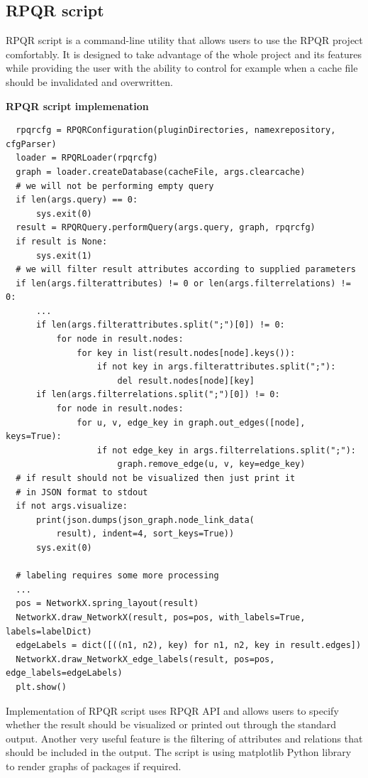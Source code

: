 \newpage

\subsection*{RPQR script}
RPQR script is a command-line utility that allows users to use the RPQR project comfortably. It is designed
to take advantage of the whole project and its features while providing the user with the ability to
control for example when a cache file should be invalidated and overwritten.

\textbf{RPQR script implemenation}

\begin{lstlisting}
  rpqrcfg = RPQRConfiguration(pluginDirectories, namexrepository, cfgParser)
  loader = RPQRLoader(rpqrcfg)
  graph = loader.createDatabase(cacheFile, args.clearcache)
  # we will not be performing empty query
  if len(args.query) == 0:
      sys.exit(0)
  result = RPQRQuery.performQuery(args.query, graph, rpqrcfg)
  if result is None:
      sys.exit(1)
  # we will filter result attributes according to supplied parameters
  if len(args.filterattributes) != 0 or len(args.filterrelations) != 0:
      ...
      if len(args.filterattributes.split(";")[0]) != 0:
          for node in result.nodes:
              for key in list(result.nodes[node].keys()):
                  if not key in args.filterattributes.split(";"):
                      del result.nodes[node][key]
      if len(args.filterrelations.split(";")[0]) != 0:
          for node in result.nodes:
              for u, v, edge_key in graph.out_edges([node], keys=True):
                  if not edge_key in args.filterrelations.split(";"):
                      graph.remove_edge(u, v, key=edge_key)
  # if result should not be visualized then just print it
  # in JSON format to stdout
  if not args.visualize:
      print(json.dumps(json_graph.node_link_data(
          result), indent=4, sort_keys=True))
      sys.exit(0)

  # labeling requires some more processing
  ...
  pos = NetworkX.spring_layout(result)
  NetworkX.draw_NetworkX(result, pos=pos, with_labels=True, labels=labelDict)
  edgeLabels = dict([((n1, n2), key) for n1, n2, key in result.edges])
  NetworkX.draw_NetworkX_edge_labels(result, pos=pos, edge_labels=edgeLabels)
  plt.show()
\end{lstlisting}

Implementation of RPQR script uses RPQR API and allows users to specify whether the result should be
visualized or printed out through the standard output. Another very useful feature is the filtering of
attributes and relations that should be included in the output. The script is using matplotlib Python
library to render graphs of packages if required.


